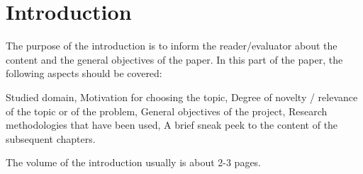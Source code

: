 \chapter*{Introduction}

The purpose of the introduction is to inform the reader/evaluator about the content and the general objectives of the paper.
In this part of the paper, the following aspects should be covered:

\begin{itemize}
    \hitem Studied domain,
    \hitem Motivation for choosing the topic,
    \hitem Degree of novelty / relevance of the topic or of the problem,
    \hitem General objectives of the project,
    \hitem Research methodologies that have been used,
    \hitem A brief sneak peek to the content of the subsequent chapters.
\end{itemize}

The volume of the introduction usually is about 2-3 pages.
